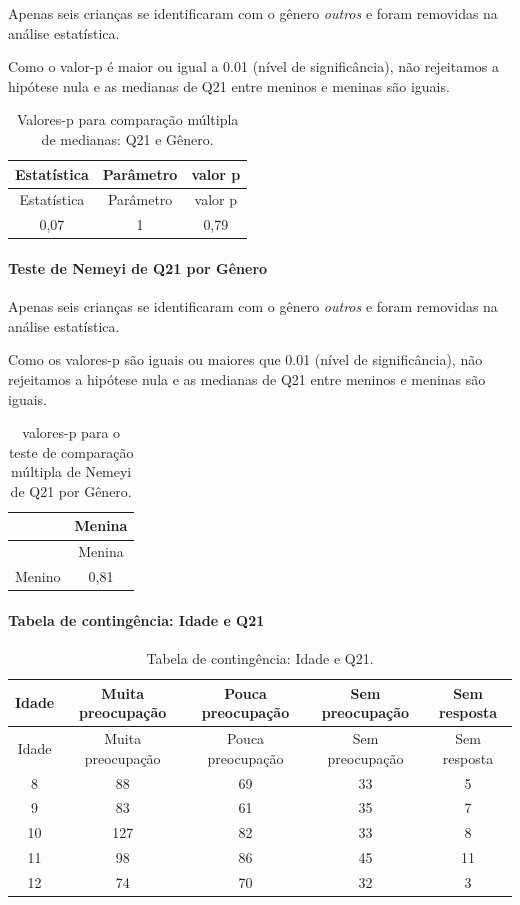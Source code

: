 \documentclass[]{article}
\let\oldparagraph\paragraph
\renewcommand{\paragraph}[1]{\oldparagraph{#1}\mbox{}}
\begin{document}
Apenas seis crianças se identificaram com o gênero \emph{outros} e foram removidas na análise estatística.

Como o valor-p é maior ou igual a 0.01 (nível de significância), não rejeitamos a hipótese nula e as medianas de Q21 entre meninos e meninas são iguais.

\begin{longtable}[]{@{}ccc@{}}
\caption{\label{tab:unnamed-chunk-442}Valores-p para comparação múltipla de medianas: Q21 e Gênero.}\tabularnewline
\toprule
Estatística & Parâmetro & valor p\tabularnewline
\midrule
\endfirsthead
\toprule
Estatística & Parâmetro & valor p\tabularnewline
\midrule
\endhead
0,07 & 1 & 0,79\tabularnewline
\bottomrule
\end{longtable}

\hypertarget{teste-de-nemeyi-de-q21-por-guxeanero}{%
\paragraph{Teste de Nemeyi de Q21 por Gênero}\label{teste-de-nemeyi-de-q21-por-guxeanero}}

Apenas seis crianças se identificaram com o gênero \emph{outros} e foram removidas na análise estatística.

Como os valores-p são iguais ou maiores que 0.01 (nível de significância), não rejeitamos a hipótese nula e as medianas de Q21 entre meninos e meninas são iguais.

\begin{longtable}[]{@{}lc@{}}
\caption{\label{tab:unnamed-chunk-444}valores-p para o teste de comparação múltipla de Nemeyi de Q21 por Gênero.}\tabularnewline
\toprule
& Menina\tabularnewline
\midrule
\endfirsthead
\toprule
& Menina\tabularnewline
\midrule
\endhead
Menino & 0,81\tabularnewline
\bottomrule
\end{longtable}

\cleardoublepage

\hypertarget{tabela-de-continguxeancia-idade-e-q21}{%
\paragraph{Tabela de contingência: Idade e Q21}\label{tabela-de-continguxeancia-idade-e-q21}}

\begin{longtable}[]{@{}ccccc@{}}
\caption{\label{tab:unnamed-chunk-445}Tabela de contingência: Idade e Q21.}\tabularnewline
\toprule
Idade & Muita preocupação & Pouca preocupação & Sem preocupação & Sem resposta\tabularnewline
\midrule
\endfirsthead
\toprule
Idade & Muita preocupação & Pouca preocupação & Sem preocupação & Sem resposta\tabularnewline
\midrule
\endhead
8 & 88 & 69 & 33 & 5\tabularnewline
9 & 83 & 61 & 35 & 7\tabularnewline
10 & 127 & 82 & 33 & 8\tabularnewline
11 & 98 & 86 & 45 & 11\tabularnewline
12 & 74 & 70 & 32 & 3\tabularnewline
\bottomrule
\end{longtable}
\end{document}
